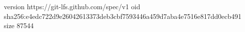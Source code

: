 version https://git-lfs.github.com/spec/v1
oid sha256:e4edc722d9e26042613373deb3cbf7593446a459d7aba4e7516e817dd0ecb491
size 87544
